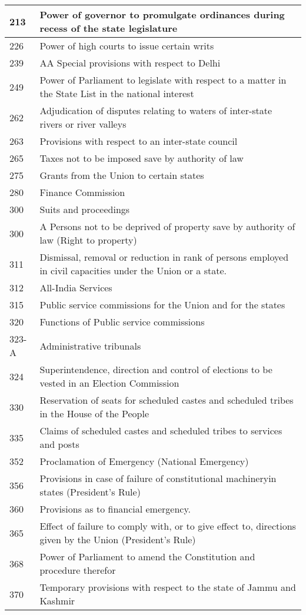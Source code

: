 \begin{longtable}[c]{@{}|p{2cm}|p{10cm}|@{}}
  213 & Power of governor to promulgate ordinances during recess of the state legislature \\ \midrule
  226 & Power of high courts to issue certain writs \\ \midrule
  239 & AA Special provisions with respect to Delhi \\ \midrule
  249 & Power of Parliament to legislate with respect  to a matter in the State List in the national interest \\ \midrule
  262 & Adjudication of disputes relating to waters of inter-state rivers or river valleys \\ \midrule
  263 & Provisions with respect to an inter-state council \\ \midrule
  265 & Taxes not to be imposed save by authority of law \\ \midrule
  275 & Grants from the Union to certain states \\ \midrule
  280 & Finance Commission \\ \midrule
  300 & Suits and proceedings \\ \midrule
  300 & A Persons not to be deprived of property save by authority of law (Right to property) \\ \midrule
  311 & Dismissal, removal or reduction in rank of persons employed in civil capacities under the Union or a state. \\ \midrule
  312 & All-India Services \\ \midrule
  315 & Public service commissions for the Union and for the states \\ \midrule
  320 & Functions of Public service commissions \\ \midrule
  323-A & Administrative tribunals \\ \midrule
  324 & Superintendence, direction and control of elections to be vested in an Election Commission \\ \midrule
  330 & Reservation of seats for scheduled castes and scheduled tribes in the House of the People \\ \midrule
  335 & Claims of scheduled castes and scheduled tribes to services and posts \\ \midrule
  352 & Proclamation of Emergency (National Emergency) \\ \midrule
  356 & Provisions in case of failure of constitutional machineryin states (President’s Rule) \\ \midrule
  360 & Provisions as to financial emergency. \\ \midrule
  365 & Effect of failure to comply with, or to give effect to, directions given by the Union (President’s Rule) \\ \midrule
  368 & Power of Parliament to amend the Constitution and procedure therefor \\ \midrule
  370 & Temporary provisions with respect to the state of  Jammu and Kashmir\\ \midrule
\end{longtable}

